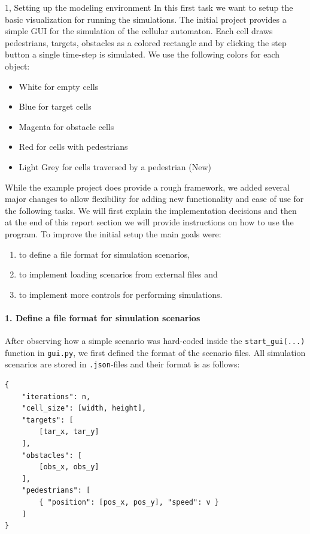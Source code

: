 \documentclass[10pt,a4paper]{article}
\begin{document}
\begin{task}{1, Setting up the modeling environment}
In this first task we want to setup the basic visualization for running the simulations. The initial project provides a simple GUI for the simulation of the cellular automaton. Each cell draws pedestrians, targets, obstacles as a colored rectangle and by clicking the step button a single time-step is simulated. We use the following colors for each object:
\begin{itemize}
    \item White for empty cells
    \item Blue for target cells
    \item Magenta for obstacle cells
    \item Red for cells with pedestrians
    \item Light Grey for cells traversed by a pedestrian (New)
\end{itemize}
While the example project does provide a rough framework, we added several major changes to allow flexibility for adding new functionality and ease of use for the following tasks. We will first explain the implementation decisions and then at the end of this report section we will provide instructions on how to use the program. To improve the initial setup the main goals were:
\begin{enumerate}
    \item to define a file format for simulation scenarios,
    \item to implement loading scenarios from external files and
    \item to implement more controls for performing simulations.
\end{enumerate}

\paragraph{1. Define a file format for simulation scenarios} 
After observing how a simple scenario was hard-coded inside the \texttt{start\_gui(...)} function in \texttt{gui.py}, we first defined the format of the scenario files. All simulation scenarios are stored in \texttt{.json}-files and their format is as follows:

\begin{verbatim}
{
    "iterations": n,
    "cell_size": [width, height],
    "targets": [
        [tar_x, tar_y]
    ],
    "obstacles": [
        [obs_x, obs_y]
    ],
    "pedestrians": [
        { "position": [pos_x, pos_y], "speed": v }
    ]
}
\end{verbatim}


\end{task}
\end{document}
